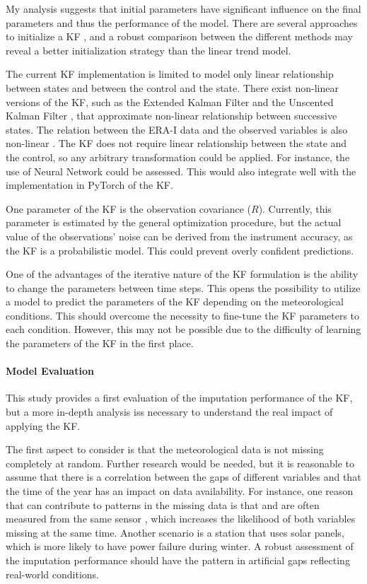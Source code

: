 \documentclass{article}
\begin{document}
My analysis suggests that initial parameters have significant influence on the final parameters and thus the performance of the model. There are several approaches to initialize a KF \cite{durbin_time_2012}, and a robust comparison between the different methods may reveal a better initialization strategy than the linear trend model.

The current KF implementation is limited to model only linear relationship between states and between the control and the state. There exist non-linear versions of the KF, such as the Extended Kalman Filter and the Unscented Kalman Filter \cite{dan_simon_optimal_2006}, that approximate non-linear relationship between successive states.
The relation between the ERA-I data and the observed variables is also non-linear \cite{vuichard_filling_2015}. The KF does not require linear relationship between the state and the control, so any arbitrary transformation could be applied. For instance, the use of Neural Network could be assessed. This would also integrate well with the implementation in \textsf{PyTorch} of the KF.

One parameter of the KF is the observation covariance ($R$). Currently, this parameter is estimated by the general optimization procedure, but the actual value of the observations' noise can be derived from the instrument accuracy, as the KF is a probabilistic model. This could prevent overly confident predictions.

One of the advantages of the iterative nature of the KF formulation is the ability to change the parameters between time steps.
This opens the possibility to utilize a model to predict the parameters of the KF depending on the meteorological conditions. This should overcome the necessity to fine-tune the KF parameters to each condition.
However, this may not be possible due to the difficulty of learning the parameters of the KF in the first place.

\paragraph{Model Evaluation} This study provides a first evaluation of the imputation performance of the KF, but a more in-depth analysis iss necessary to understand the real impact of applying the KF.

The first aspect to consider is that the meteorological data is not missing completely at random. Further research would be needed, but it is reasonable to assume that there is a correlation between the gaps of different variables and that the time of the year has an impact on data availability. For instance, one reason that can contribute to patterns in the missing data is that  and  are often measured from the same sensor \cite{noauthor_associated_2020, noauthor_specification_nodate}, which increases the likelihood of both variables missing at the same time. Another scenario is a station that uses solar panels, which is more likely to have power failure during winter. A robust assessment of the imputation performance should have the pattern in artificial gaps reflecting real-world conditions.
\end{document}
